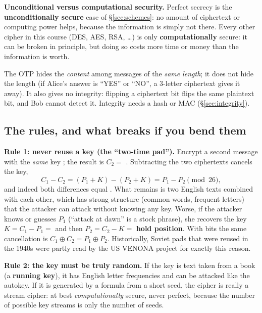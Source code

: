 \textbf{Unconditional versus computational security.} Perfect secrecy is the \textbf{unconditionally secure} case of \S\ref{sec:schemes}: no amount of ciphertext or computing power helps, because the information is simply not there. Every other cipher in this course (DES, AES, RSA, \dots) is only \textbf{computationally} secure: it can be broken in principle, but doing so costs more time or money than the information is worth.

\begin{trap}
The OTP hides the \emph{content} among messages of the \emph{same length}; it does not hide the length (if Alice's answer is ``YES'' or ``NO'', a 3-letter ciphertext gives it away). It also gives no integrity: flipping a ciphertext bit flips the same plaintext bit, and Bob cannot detect it. Integrity needs a hash or MAC (\S\ref{sec:integrity}).
\end{trap}

\subsection{The rules, and what breaks if you bend them}
\textbf{Rule 1: never reuse a key (the ``two-time pad'').} Encrypt a second message  with the \emph{same} key ; the result is $C_2 = $ . Subtracting the two ciphertexts cancels the key,
\[
C_1 - C_2 = (P_1 + K) - (P_2 + K) = P_1 - P_2 \pmod{26},
\]
and indeed both differences equal . What remains is two English texts combined with each other, which has strong structure (common words, frequent letters) that the attacker can attack without knowing any key. Worse, if the attacker knows or guesses $P_1$ (``attack at dawn'' is a stock phrase), she recovers the key $K = C_1 - P_1 = $  and then $P_2 = C_2 - K = $ \textbf{hold position}. With bits the same cancellation is $C_1 \oplus C_2 = P_1 \oplus P_2$. Historically, Soviet pads that were reused in the 1940s were partly read by the US VENONA project for exactly this reason.

\textbf{Rule 2: the key must be truly random.} If the key is text taken from a book (a \textbf{running key}), it has English letter frequencies and can be attacked like the autokey. If it is generated by a formula from a short seed, the cipher is really a stream cipher: at best \emph{computationally} secure, never perfect, because the number of possible key streams is only the number of seeds.

